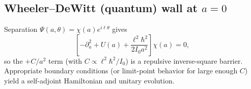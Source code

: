 
\subsection{Wheeler--DeWitt (quantum) wall at $a=0$}\label{sec:wdw}
Separation $\Psi(a,\theta)=\chi(a)e^{i\ell\theta}$ gives
\begin{equation}
 \left[-\partial_a^2 + U(a) + \frac{\ell^2\hbar^2}{2 I_0 a^2}\right]\chi(a)=0,
\end{equation}
so the $+C/a^2$ term (with $C\propto \ell^2\hbar^2/I_0$) is a repulsive inverse-square barrier. Appropriate boundary conditions (or limit-point behavior for large enough $C$) yield a self-adjoint Hamiltonian and unitary evolution.
